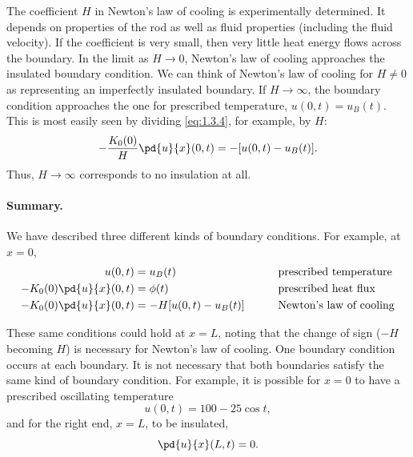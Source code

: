 The coefficient $H$ in Newton's law of cooling is experimentally determined. It depends on properties of the rod as well as fluid properties (including the fluid velocity). If the coefficient is very small, then very little heat energy flows across the boundary. In the limit as $H \to 0$, Newton's law of cooling approaches the insulated boundary condition. We can think of Newton's law of cooling for $H \neq 0$ as representing an imperfectly insulated boundary. If $H \to \infty$, the boundary condition approaches the one for prescribed temperature, $u(0,t) = u_B(t)$. This is most easily seen by dividing \eqref{eq:1.3.4}, for example, by $H$:
\[
-\frac{K_0(0)}{H}\pd{u}{x}(0,t) = -[u(0,t) - u_B(t)].
\]
Thus, $H \to \infty$ corresponds to no insulation at all.

\paragraph{Summary.}
We have described three different kinds of boundary conditions. For example, at $x = 0$,
\begin{alignat}{3}
u(0,t) &= u_B(t) &\qquad& \text{prescribed temperature} \notag\\
-K_0(0)\pd{u}{x}(0,t) &= \phi(t) &\qquad& \text{prescribed heat flux} \notag\\
-K_0(0)\pd{u}{x}(0,t) &= -H[u(0,t) - u_B(t)] &\qquad& \text{Newton's law of cooling} \notag
\end{alignat}

These same conditions could hold at $x = L$, noting that the change of sign ($-H$ becoming $H$) is necessary for Newton's law of cooling. One boundary condition occurs at each boundary. It is not necessary that both boundaries satisfy the same kind of boundary condition. For example, it is possible for $x = 0$ to have a prescribed oscillating temperature
\[
u(0,t) = 100 - 25\cos t,
\]
and for the right end, $x = L$, to be insulated,
\[
\pd{u}{x}(L,t) = 0.
\]

